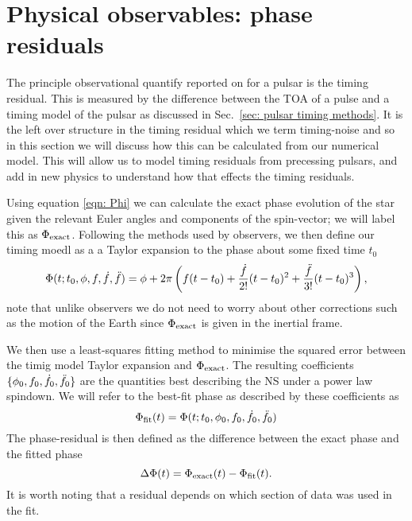 \documentclass[../full_thesis/full_thesis.tex]{subfiles}
\begin{document}
\section{Physical observables: phase residuals}
\label{sec: timing residuals}

The principle observational quantify reported on for a pulsar is the timing
residual. This is measured by the difference between the TOA of a pulse and a
timing model of the pulsar as discussed in Sec.~\ref{sec: pulsar timing
methods}. It is the left over structure in the timing residual which we
term timing-noise and so in this section we will discuss how this can be calculated
from our numerical model. This will allow us to model timing residuals from
precessing pulsars, and add in new physics to understand how that effects the
timing residuals.

Using equation \eqref{eqn: Phi} we can calculate the exact phase evolution of
the star given the relevant Euler angles and components of the spin-vector; we
will label this as $\Phi_{\mathrm{exact}}$. Following the methods used by observers, we
then define our timing moedl as a
a Taylor expansion to the phase about some fixed time $t_{0}$
\begin{equation}
    \Phi(t; t_{0}, \phi, f, \dot{f}, \ddot{f}) =
    \phi + 2\pi \left(f(t - t_{0}) +
                          \frac{\dot{f}}{2!}(t-t_{0})^{2} +
                          \frac{\ddot{f}}{3!}(t-t_{0})^{3}
                          \right),
\label{eqn: TR taylor expansion}
\end{equation}
note that unlike observers we do not need to worry about other corrections such
as the motion of the Earth since $\Phi_{\mathrm{exact}}$ is given in the inertial frame.

We then use a least-squares fitting method to minimise the squared error
between the timig model Taylor expansion and $\Phi_{\mathrm{exact}}$. The resulting
coefficients $\{\phi_{0}, f_{0}, \dot{f}_{0}, \ddot{f}_{0}\}$ are the quantities
best describing the NS under a power law spindown. We will refer to the
best-fit phase as described by  these coefficients as
\begin{equation}
    \Phi_{\mathrm{fit}}(t) = \Phi(t; t_{0}, \phi_{0}, f_{0}, \dot{f}_{0}, \ddot{f}_{0})
\end{equation}
The phase-residual is then defined as the difference between the exact phase
and the fitted phase
\begin{equation}
  \Delta\Phi(t) = \Phi_{\mathrm{exact}}(t) - \Phi_{\mathrm{fit}}(t).
\end{equation}
It is worth noting that a residual depends on which section of data was
used in the fit.
\end{document}
